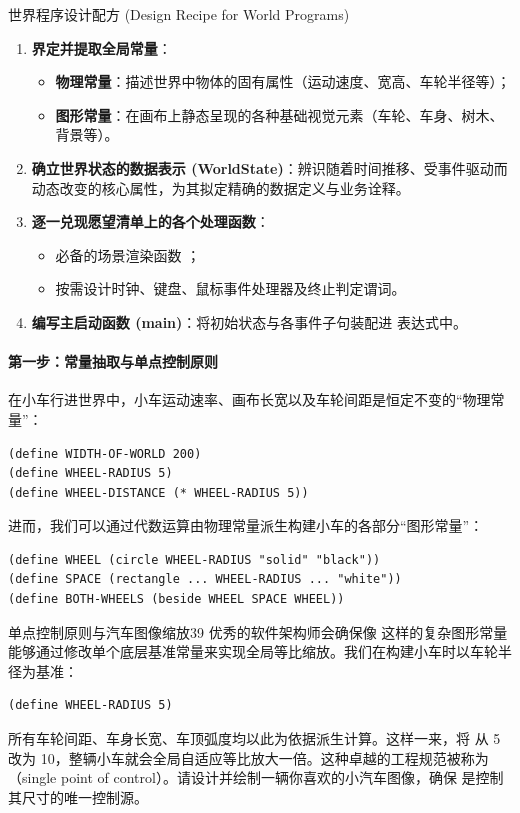 \begin{recipebox}{世界程序设计配方 (Design Recipe for World Programs)}
\begin{enumerate}
  \item \textbf{界定并提取全局常量}：
    \begin{itemize}
      \item \textbf{物理常量}：描述世界中物体的固有属性（运动速度、宽高、车轮半径等）；
      \item \textbf{图形常量}：在画布上静态呈现的各种基础视觉元素（车轮、车身、树木、背景等）。
    \end{itemize}
  \item \textbf{确立世界状态的数据表示 (WorldState)}：辨识随着时间推移、受事件驱动而动态改变的核心属性，为其拟定精确的数据定义与业务诠释。
  \item \textbf{逐一兑现愿望清单上的各个处理函数}：
    \begin{itemize}
      \item 必备的场景渲染函数 ；
      \item 按需设计时钟、键盘、鼠标事件处理器及终止判定谓词。
    \end{itemize}
  \item \textbf{编写主启动函数 (main)}：将初始状态与各事件子句装配进  表达式中。
\end{enumerate}
\end{recipebox}

\paragraph{第一步：常量抽取与单点控制原则}
在小车行进世界中，小车运动速率、画布长宽以及车轮间距是恒定不变的“物理常量”：
\begin{lstlisting}[language=BSL]
(define WIDTH-OF-WORLD 200)
(define WHEEL-RADIUS 5)
(define WHEEL-DISTANCE (* WHEEL-RADIUS 5))
\end{lstlisting}

进而，我们可以通过代数运算由物理常量派生构建小车的各部分“图形常量”：
\begin{lstlisting}[language=BSL]
(define WHEEL (circle WHEEL-RADIUS "solid" "black"))
(define SPACE (rectangle ... WHEEL-RADIUS ... "white"))
(define BOTH-WHEELS (beside WHEEL SPACE WHEEL))
\end{lstlisting}

\begin{exercise}{单点控制原则与汽车图像缩放}{39}
优秀的软件架构师会确保像  这样的复杂图形常量能够通过修改单个底层基准常量来实现全局等比缩放。我们在构建小车时以车轮半径为基准：
\begin{lstlisting}[language=BSL]
(define WHEEL-RADIUS 5)
\end{lstlisting}
所有车轮间距、车身长宽、车顶弧度均以此为依据派生计算。这样一来，将  从 5 改为 10，整辆小车就会全局自适应等比放大一倍。这种卓越的工程规范被称为（single point of control）。请设计并绘制一辆你喜欢的小汽车图像，确保  是控制其尺寸的唯一控制源。
\end{exercise}

